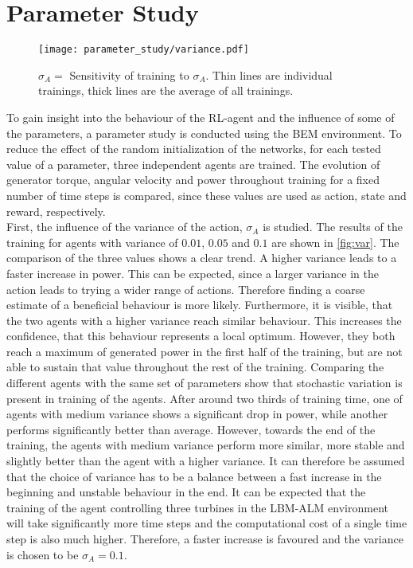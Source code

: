 \section{Parameter Study}
\begin{figure}[ht]
	\centering
	\texttt{[image: parameter\_study/variance.pdf]}
	\caption{$\sigma_A=$ Sensitivity of training to $\sigma_A$. Thin lines are individual trainings, thick lines are the average of all trainings.}
	\label{fig:var}
\end{figure}
To gain insight into the behaviour of the RL-agent and the influence of some of the parameters, a parameter study is conducted using the BEM environment. To reduce the effect of the random initialization of the networks, for each tested value of a parameter, three independent agents are trained. The evolution of generator torque, angular velocity and power throughout training for a fixed number of time steps is compared, since these values are used as action, state and reward, respectively. \\
First, the influence of the variance of the action, $\sigma_A$ is studied. The results of the training for agents with variance of $0.01$, $0.05$ and $0.1$ are shown in \autoref{fig:var}. The comparison of the three values shows a clear trend. A higher variance leads to a faster increase in power. 
This can be expected, since a larger variance in the action leads to trying a wider range of actions. Therefore finding a coarse estimate of a beneficial behaviour is more likely. Furthermore, it is visible, that the two agents with a higher variance reach similar behaviour. This increases the confidence, that this behaviour represents a local optimum. However, they both reach a maximum of generated power in the first half of the training, but are not able to sustain that value throughout the rest of the training. Comparing the different agents with the same set of parameters show that stochastic variation is present in training of the agents.  After around two thirds of training time, one of agents with medium variance shows a significant drop in power, while another performs significantly better than average. However, towards the end of the training, the agents with medium variance perform more similar, more stable and slightly better than the agent with a higher variance. It can therefore be assumed that the choice of variance has to be a balance between a fast increase in the beginning and unstable behaviour in the end. It can be expected that the training of the agent controlling three turbines in the LBM-ALM environment will take significantly more time steps and the computational cost of a single time step is also much higher. Therefore, a faster increase is favoured and the variance is chosen to be $\sigma_A = 0.1$. \\
